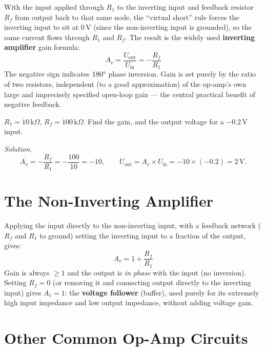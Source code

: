 With the input applied through $R_1$ to the inverting input and feedback
resistor $R_f$ from output back to that same node, the ``virtual short''
rule forces the inverting input to sit at 0\,V (since the non-inverting
input is grounded), so the same current flows through $R_1$ and $R_f$.
The result is the widely used \textbf{inverting amplifier} gain formula:
\[
\boxed{A_v = \frac{U_{\text{out}}}{U_{\text{in}}} = -\frac{R_f}{R_1}}
\]
The negative sign indicates $180\degree$ phase inversion. Gain is set
purely by the ratio of two resistors, independent (to a good
approximation) of the op-amp's own large and imprecisely specified
open-loop gain --- the central practical benefit of negative feedback.

\begin{examplebox}
$R_1 = 10\,\text{k}\Omega$, $R_f = 100\,\text{k}\Omega$. Find the gain,
and the output voltage for a $-0.2\,\text{V}$ input.

\emph{Solution.}
\[
A_v = -\frac{R_f}{R_1} = -\frac{100}{10} = -10, \qquad
U_{\text{out}} = A_v \times U_{\text{in}} = -10 \times (-0.2) = 2\,\text{V}.
\]
\end{examplebox}

\section{The Non-Inverting Amplifier}

Applying the input directly to the non-inverting input, with a feedback
network ($R_f$ and $R_1$ to ground) setting the inverting input to a
fraction of the output, gives:
\[
\boxed{A_v = 1 + \frac{R_f}{R_1}}
\]
Gain is always $\geq 1$ and the output is \emph{in phase} with the
input (no inversion). Setting $R_f = 0$ (or removing it and connecting
output directly to the inverting input) gives $A_v = 1$: the
\textbf{voltage follower} (buffer), used purely for its extremely high
input impedance and low output impedance, without adding voltage gain.

\section{Other Common Op-Amp Circuits}

